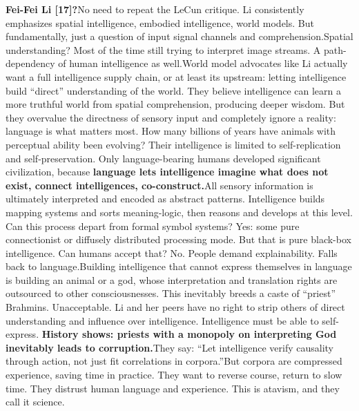 \documentclass[11pt]{article}
\renewcommand{\\}[1][\mynewlineskip]{\oldnewline[#1]}
\begin{document}
\vspace{1em}
\textbf{Fei-Fei Li [17]?}\\
No need to repeat the LeCun critique. Li consistently emphasizes spatial intelligence, embodied intelligence, world models. But fundamentally, just a question of input signal channels and comprehension.\\
Spatial understanding? Most of the time still trying to interpret image streams. A path-dependency of human intelligence as well.\\
World model advocates like Li actually want a full intelligence supply chain, or at least its upstream: letting intelligence build ``direct'' understanding of the world. They believe intelligence can learn a more truthful world from spatial comprehension, producing deeper wisdom. But they overvalue the directness of sensory input and completely ignore a reality: language is what matters most. How many billions of years have animals with perceptual ability been evolving? Their intelligence is limited to self-replication and self-preservation. Only language-bearing humans developed significant civilization, because \textbf{language lets intelligence imagine what does not exist, connect intelligences, co-construct.}\\
All sensory information is ultimately interpreted and encoded as abstract patterns. Intelligence builds mapping systems and sorts meaning-logic, then reasons and develops at this level. Can this process depart from formal symbol systems? Yes: some pure connectionist or diffusely distributed processing mode. But that is pure black-box intelligence. Can humans accept that? No. People demand explainability. Falls back to language.\\
Building intelligence that cannot express themselves in language is building an animal or a god, whose interpretation and translation rights are outsourced to other consciousnesses. This inevitably breeds a caste of ``priest'' Brahmins. Unacceptable. Li and her peers have no right to strip others of direct understanding and influence over intelligence. Intelligence must be able to self-express. \textbf{History shows: priests with a monopoly on interpreting God inevitably leads to corruption.}\\
They say: ``Let intelligence verify causality through action, not just fit correlations in corpora.''\\
But corpora are compressed experience, saving time in practice. They want to reverse course, return to slow time. They distrust human language and experience. This is atavism, and they call it science.\\
\end{document}
